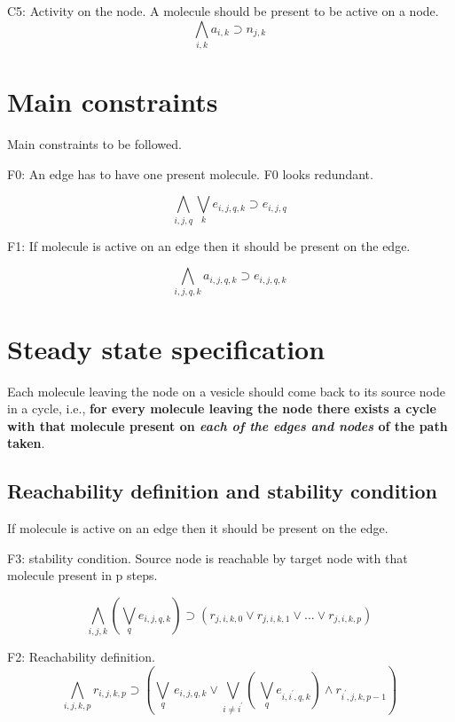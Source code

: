 \documentclass{llncs}
\begin{document}
C5: Activity on the node. A molecule should be present to be active on a node.  
\[ \bigwedge\limits_{i,k} a_{i,k} \supset n_{j,k} \, \]  




\section{Main constraints}
Main constraints to be followed. \newline

F0:  An edge has to have one present molecule. F0 looks redundant.

\[ \bigwedge\limits_{i,j,q} \bigvee_k e_{i,j,q,k} \supset e_{i,j,q} \, \]  

F1: If molecule is active on an edge then it should be present on the edge.

\[ \bigwedge\limits_{i,j,q,k} a_{i,j,q,k} \supset e_{i,j,q,k}\, \]



\section{Steady state specification}
Each molecule leaving the node on a vesicle should come back to its source node in a cycle, i.e., \textbf{for every molecule leaving the node there exists a cycle with that molecule present on \textit{each of the edges and nodes} of the path taken}.

\subsection{Reachability definition and stability condition}
If molecule is active on an edge then it should be present on the edge. \newline


F3: stability condition. Source node is reachable by target node with that molecule present in p steps.


\[ \bigwedge\limits_{i,j,k} (\bigvee_{q} e_{i,j,q,k}) \supset (r_{j,i,k,0}  \lor r_{j,i,k,1} \lor ... \lor r_{j,i,k,p}) \, \]

F2: Reachability definition.
\[ \bigwedge\limits_{i,j,k,p} r_{i,j,k,p} \supset (\bigvee_{q} \, e_{i,j,q,k} \lor \bigvee_{i\neq i^{\prime}} ( \, \bigvee_{q} e_{i,i^{\prime},q,k}) \land r_{i^{\prime},j,k,p-1} ) \, \]
\end{document}
